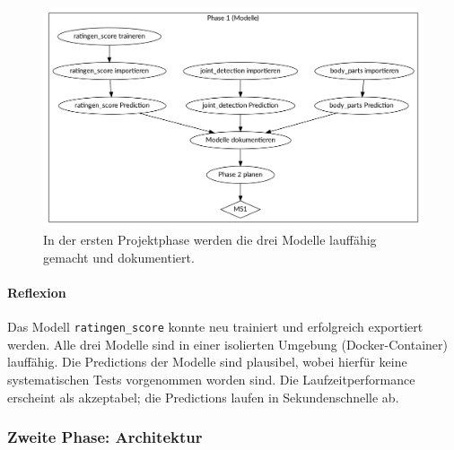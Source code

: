 \begin{figure}
    \centering
    \includegraphics[width=\linewidth]{pics/phase1.png}
    \caption{In der ersten Projektphase werden die drei Modelle lauffähig gemacht und dokumentiert.}
    \label{fig:projekt-phase1}
\end{figure}

\paragraph{Reflexion}

Das Modell \texttt{ratingen\_score} konnte neu trainiert und erfolgreich exportiert werden. Alle drei Modelle sind in einer isolierten Umgebung (Docker-Container) lauffähig. Die Predictions der Modelle sind plausibel, wobei hierfür keine systematischen Tests vorgenommen worden sind. Die Laufzeitperformance erscheint als akzeptabel; die Predictions laufen in Sekundenschnelle ab.

\subsubsection{Zweite Phase: Architektur}

